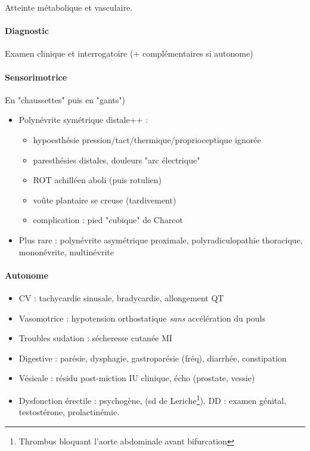 \documentclass{book}
\begin{document}
Atteinte métabolique et vasculaire.

\paragraph{Diagnostic}
\label{sec:org35f00bc}
Examen clinique et interrogatoire (+ complémentaires si autonome)

\paragraph{Sensorimotrice}
\label{sec:org77908bf}
En "chaussettes" puis en "gants")
\begin{itemize}
\item Polynévrite symétrique distale++ :
\begin{itemize}
\item hypoesthésie pression/tact/thermique/proprioceptique ignorée
\item \textpm{} paresthésies distales, douleurs "arc électrique"
\item ROT achilléen aboli (puis rotulien)
\item voûte plantaire se creuse (tardivement)
\item complication : pied "cubique" de Charcot
\end{itemize}
\item Plus rare : polynévrite asymétrique proximale, polyradiculopathie
thoracique, mononévrite, multinévrite
\end{itemize}

\paragraph{Autonome}
\label{sec:org5e77c6c}
\begin{itemize}
\item CV : tachycardie sinusale, bradycardie, allongement QT
\item Vasomotrice : hypotension orthostatique \emph{sans} accélération du pouls
\item Troubles sudation : sécheresse cutanée MI
\item Digestive : parésie, dysphagie, gastroparésie (fréq), diarrhée, constipation
\item Vésicale : résidu post-miction \thus IU \thus clinique, écho (prostate, vessie)
\item Dysfonction érectile : psychogène, (sd de Leriche\footnote{Thrombus bloquant l'aorte abdominale avant bifurcation}). DD : examen génital, testostérone, prolactinémie.
\end{itemize}
\end{document}
